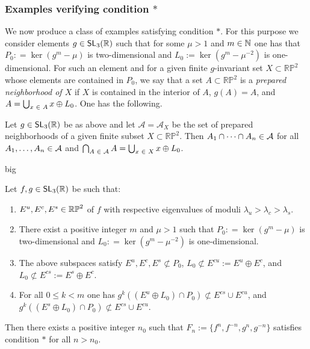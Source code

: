 \documentclass[AHL,Unicode,longabstracts]{cedram}
\DeclareMathOperator{\SL}{\mathsf{SL}}
\newcommand{\clA}{\mathcal{A}}
\newcommand{\N}{\mathbb{N}}
\newcommand{\R}{\mathbb{R}}
\newcommand{\RR}{\R}
\newcommand{\RP}{{\RR\mathbb{P}}}
\let\oldin\in
\renewcommand{\in}{\mathchoice{\oldin}{\oldin}{\,\oldin\,}{\,\oldin\,}}
\newcommand{\RR}{\mathbb{R}}
\begin{document}
\subsubsection{Examples verifying condition $\ast$}



We now produce a class of examples satisfying condition $\ast$. For this purpose we consider elements $g \in \SL_3(\R)$ such that for some $\mu > 1$ and $m \in \N$ one has that $P_0: = \ker(g^m - \mu)$ is two-dimensional and $L_0:=\ker(g^m - \mu^{-2}) $ is one-dimensional. For such an element and for a given finite $g$-invariant set $X \subset \RP^2$ whose elements are contained in $P_0$, we say that a set $A \subset \RP^2$ is a \emph{prepared neighborhood of $X$} if $X$ is contained in the interior of $A$, $g(A) = A$, and $A = \bigcup_{x \in A}x \oplus L_0$. One has the following.

\begin{prop}\label{beprepared}
Let $g\in\SL_3(\R)$ be as above and let $\clA=\clA_X$ be the set of prepared neighborhoods of a given finite subset $X\subset\RP^2$. Then $A_1 \cap \cdots \cap A_n \in \clA$ for all $A_1,\ldots, A_n \in \clA$ and $\bigcap_{A \in \clA}A = \bigcup_{x \in X}x \oplus L_0$.
\end{prop}big


\begin{lemm}\label{fabricaqi}
Let $f,g \in \SL_3(\R)$ be such that:
\begin{enumerate}
\item\label{lemm4.4.1} $E^u, E^c, E^s \in \RP^2$ of $f$ with respective eigenvalues of moduli $\lambda_u > \lambda_c > \lambda_s$.
\item\label{lemm4.4.2} There exist a positive integer $m$ and $\mu > 1$ such that $P_0: = \ker(g^m-\mu)$ is two-dimensional and $L_0: = \ker(g^m - \mu^{-2}) $ is one-dimensional.
\item\label{lemm4.4.3} The above subspaces satisfy $E^u,E^c, E^s \not\subset P_0$, $L_0 \not\subset E^{cu} := E^u \oplus E^c$, and $L_0 \not\subset E^{cs} := E^s \oplus E^c$.
\item\label{lemm4.4.4} For all $0 \le k < m$ one has $g^k((E^u \oplus L_0) \cap P_0) \not\subset E^{cs} \cup E^{cu}$, and $g^k((E^s \oplus L_0) \cap P_0) \not\subset E^{cs} \cup E^{cu}$.
\end{enumerate}
Then there exists a positive integer $n_0$ such that $F_n := \{ f^n,f^{-n},g^n,g^{-n}\}$ satisfies condition $\ast$ for all $n > n_0$.
\end{lemm}
\end{document}
